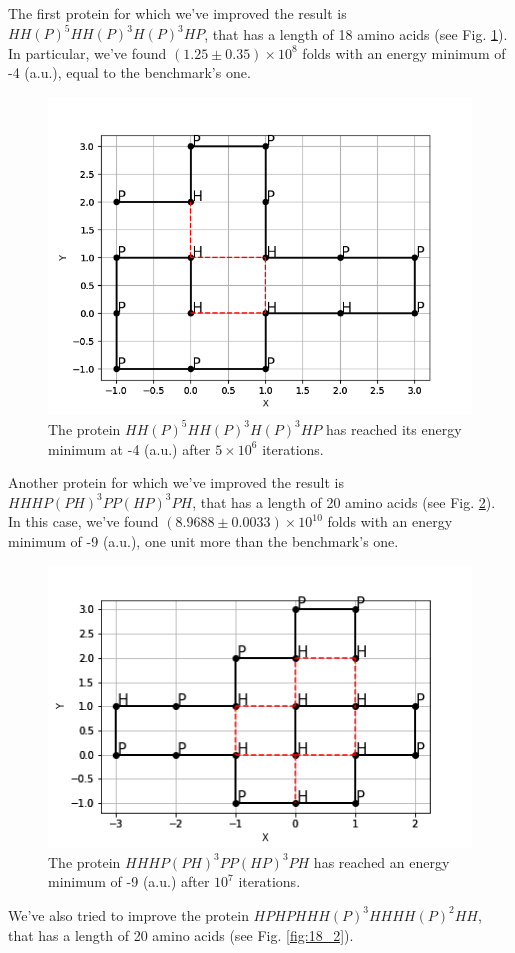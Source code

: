 The first protein for which we've improved the result is $HH(P)^5HH(P)^3H(P)^3HP$, that has a length of 18 amino acids (see Fig. \ref{fig:18_1}).
In particular, we've found $(1.25 \pm 0.35) \times 10^8$ folds with an energy minimum of -4 (a.u.), equal to the benchmark's one.
\begin{figure}[H]
    \centering
    \includegraphics[width=.75\textwidth]{./img/18_1.png}
    \caption{The protein $HH(P)^5HH(P)^3H(P)^3HP$ has reached its energy minimum at -4 (a.u.) after $5 \times 10^6$ iterations.}
    \label{fig:18_1}
\end{figure}
Another protein for which we've improved the result is $HHHP(PH)^3PP(HP)^3PH$, that has a length of 20 amino acids (see Fig. \ref{fig:20_2}).
In this case, we've found $(8.9688 \pm 0.0033) \times 10^{10}$ folds with an energy minimum of -9 (a.u.), one unit more than the benchmark's one.
\begin{figure}[H]
    \centering
    \includegraphics[width=.75\textwidth]{./img/20_2.png}
    \caption{The protein $HHHP(PH)^3PP(HP)^3PH$ has reached an energy minimum of -9 (a.u.) after $10^7$ iterations.}
    \label{fig:20_2}
\end{figure}
We've also tried to improve the protein $HPHPHHH(P)^3HHHH(P)^2HH$, that has a length of 20 amino acids (see Fig. \ref{fig:18_2}).
